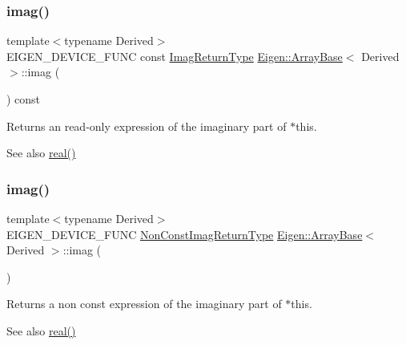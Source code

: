 \subsubsection{\texorpdfstring{imag()}{imag()}\hspace{0.1cm}{\footnotesize\ttfamily [1/2]}}
{\footnotesize\ttfamily template$<$typename Derived$>$ \\
E\+I\+G\+E\+N\+\_\+\+D\+E\+V\+I\+C\+E\+\_\+\+F\+U\+NC const \mbox{\hyperlink{class_eigen_1_1_cwise_unary_op}{Imag\+Return\+Type}} \mbox{\hyperlink{class_eigen_1_1_array_base}{Eigen\+::\+Array\+Base}}$<$ Derived $>$\+::imag (\begin{DoxyParamCaption}{ }\end{DoxyParamCaption}) const\hspace{0.3cm}{\ttfamily [inline]}}

\begin{DoxyReturn}{Returns}
an read-\/only expression of the imaginary part of {\ttfamily $\ast$this}.
\end{DoxyReturn}
\begin{DoxySeeAlso}{See also}
\mbox{\hyperlink{class_eigen_1_1_array_base_ab520a5e364380a10d471534c1e3d2253}{real()}} 
\end{DoxySeeAlso}
\mbox{\label{class_eigen_1_1_array_base_a09aadb6a71f9293d19c638598a418c92}} 
\subsubsection{\texorpdfstring{imag()}{imag()}\hspace{0.1cm}{\footnotesize\ttfamily [2/2]}}
{\footnotesize\ttfamily template$<$typename Derived$>$ \\
E\+I\+G\+E\+N\+\_\+\+D\+E\+V\+I\+C\+E\+\_\+\+F\+U\+NC \mbox{\hyperlink{class_eigen_1_1_cwise_unary_view}{Non\+Const\+Imag\+Return\+Type}} \mbox{\hyperlink{class_eigen_1_1_array_base}{Eigen\+::\+Array\+Base}}$<$ Derived $>$\+::imag (\begin{DoxyParamCaption}{ }\end{DoxyParamCaption})\hspace{0.3cm}{\ttfamily [inline]}}

\begin{DoxyReturn}{Returns}
a non const expression of the imaginary part of {\ttfamily $\ast$this}.
\end{DoxyReturn}
\begin{DoxySeeAlso}{See also}
\mbox{\hyperlink{class_eigen_1_1_array_base_ab520a5e364380a10d471534c1e3d2253}{real()}} 
\end{DoxySeeAlso}
\mbox{\label{class_eigen_1_1_array_base_a6b2a84065ff875d9491cf8d84ddbee2f}} 
